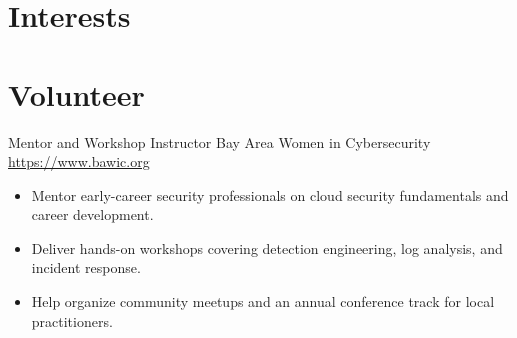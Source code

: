 \documentclass[a4paper, serif, 10pt]{moderncv}
\begin{document}
\section{Interests}

\section{Volunteer}

        {Mentor and Workshop Instructor}
        {Bay Area Women in Cybersecurity}
        {\url{https://www.bawic.org}}
        {}
        {\begin{itemize}
\item Mentor early-career security professionals on cloud security fundamentals and career development.
\item Deliver hands-on workshops covering detection engineering, log analysis, and incident response.
\item Help organize community meetups and an annual conference track for local practitioners.
\end{itemize}}
    
\end{document}
